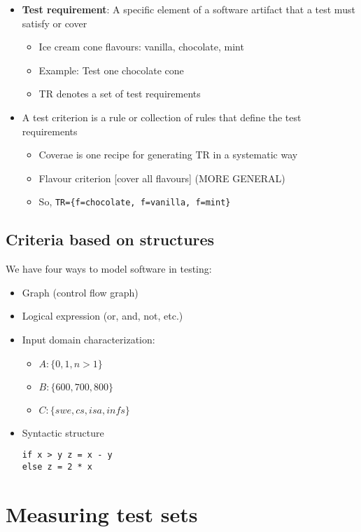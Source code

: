 \documentclass[12pt]{book}
\begin{document}
\begin{itemize}
  \item \textbf{Test requirement}: A specific element of a software artifact that a test must satisfy or cover
  \begin{itemize}
    \item Ice cream cone flavours: vanilla, chocolate, mint
    \item Example: Test one chocolate cone
    \item TR denotes a set of test requirements
  \end{itemize} 

  \item A test criterion is a rule or collection of rules that define the test requirements
  \begin{itemize}
    \item Coverae is one recipe for generating TR in a systematic way
    \item Flavour criterion [cover all flavours] (MORE GENERAL)
    \item So, \texttt{TR=\{f=chocolate, f=vanilla, f=mint\}}
  \end{itemize} 
\end{itemize}

\subsection{Criteria based on structures}
We have four ways to model software in testing:
\begin{itemize}
  \item Graph (control flow graph)
  \item Logical expression (or, and, not, etc.)
  \item Input domain characterization:
  \begin{itemize}
    \item $A:\{0,1,n>1\}$
    \item $B:\{600,700,800\}$
    \item $C:\{swe, cs, isa, infs\}$
  \end{itemize}
  \item Syntactic structure
  \begin{lstlisting}
if x > y z = x - y
else z = 2 * x
  \end{lstlisting} 
\end{itemize}

\section{Measuring test sets}
\end{document}

